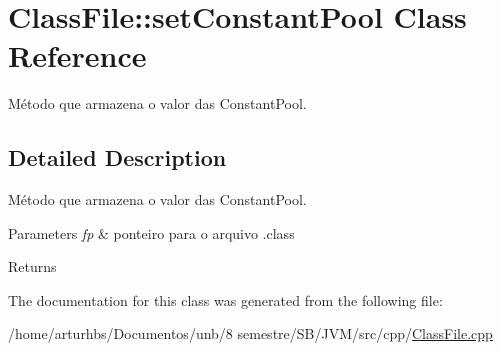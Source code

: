 \hypertarget{classClassFile_1_1setConstantPool}{}\section{Class\+File\+:\+:set\+Constant\+Pool Class Reference}
\label{classClassFile_1_1setConstantPool}


Método que armazena o valor das Constant\+Pool.  




\subsection{Detailed Description}
Método que armazena o valor das Constant\+Pool. 


\begin{DoxyParams}{Parameters}
{\em fp} & ponteiro para o arquivo .class \\
\hline
\end{DoxyParams}
\begin{DoxyReturn}{Returns}

\end{DoxyReturn}


The documentation for this class was generated from the following file\+:\begin{DoxyCompactItemize}
\item 
/home/arturhbs/\+Documentos/unb/8 semestre/\+S\+B/\+J\+V\+M/src/cpp/\hyperlink{ClassFile_8cpp}{Class\+File.\+cpp}\end{DoxyCompactItemize}
